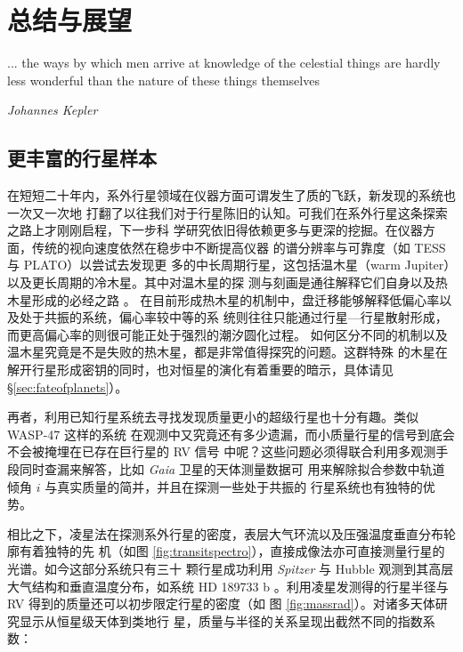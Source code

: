\chapter{总结与展望} \label{chapter:conclusion}

\epigraph{... the ways by which men arrive at knowledge of the celestial things are hardly less wonderful than the nature of these things themselves}{\textit{Johannes Kepler}}


\section{更丰富的行星样本}

在短短二十年内，系外行星领域在仪器方面可谓发生了质的飞跃，新发现的系统也一次又一次地
打翻了以往我们对于行星陈旧的认知。可我们在系外行星这条探索之路上才刚刚启程，下一步科
学研究依旧得依赖更多与更深的挖掘。在仪器方面，传统的视向速度依然在稳步中不断提高仪器
的谱分辨率与可靠度（如 TESS\cite{Ricker2015} 与 PLATO\cite{Rauer2014}）以尝试去发现更
多的中长周期行星，这包括温木星（warm Jupiter）以及更长周期的冷木星。其中对温木星的探
测与刻画是通往解释它们自身以及热木星形成的必经之路
\cite{Petrovich2016,Huang2016,Dong2014a,Frewen2016,Dawson2014a,Antonini2016}。
在目前形成热木星的机制中，盘迁移能够解释低偏心率以及处于共振的系统，偏心率较中等的系
统则往往只能通过行星---行星散射形成，而更高偏心率的则很可能正处于强烈的潮汐圆化过程。
如何区分不同的机制以及温木星究竟是不是失败的热木星，都是非常值得探究的问题。这群特殊
的木星在解开行星形成密钥的同时，也对恒星的演化有着重要的暗示，具体请见 \S \ref{sec:fateofplanets}）。

再者，利用已知行星系统去寻找发现质量更小的超级行星也十分有趣。类似 WASP-47 这样的系统
在观测中又究竟还有多少遗漏，而小质量行星的信号到底会不会被掩埋在已存在巨行星的 RV 信号
中呢？这些问题必须得联合利用多观测手段同时查漏来解答，比如 \textit{Gaia} 卫星的天体测量数据可
用来解除拟合参数中轨道倾角 $i$ 与真实质量的简并\cite{Gaia2016}，并且在探测一些处于共振的
行星系统也有独特的优势\cite{Wu2016}。

相比之下，凌星法在探测系外行星的密度，表层大气环流以及压强温度垂直分布轮廓有着独特的先
机（如图 \ref{fig:transitspectro}），直接成像法亦可直接测量行星的光谱。如今这部分系统只有三十
颗行星成功利用 \textit{Spitzer} 与 Hubble 观测到其高层大气结构和垂直温度分布，如系统 HD 189733 b
\cite{Knutson2007}。利用凌星发测得的行星半径与 RV 得到的质量还可以初步限定行星的密度（如
图 \ref{fig:massrad}）。对诸多天体研究\cite{Baraffe2008,Fortney2007}显示从恒星级天体到类地行
星，质量与半径的关系呈现出截然不同的指数系数：

